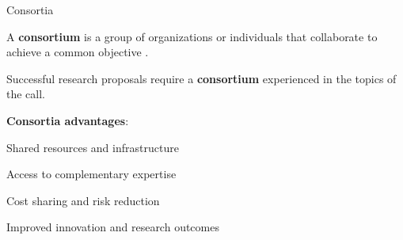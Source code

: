 \begin{tframe}{Consortia}


A \textbf{consortium} is a group of organizations or individuals that collaborate to achieve a common objective \cite{KATZ19971}.

\vspace{0.5cm}

Successful research proposals require a \textbf{consortium} experienced in the topics of the call.

\vspace{0.5cm}

\textbf{Consortia advantages}:
\begin{adv}
    \item Shared resources and infrastructure
    \item Access to complementary expertise
    \item Cost sharing and risk reduction
    \item Improved innovation and research outcomes
\end{adv}

\end{tframe}